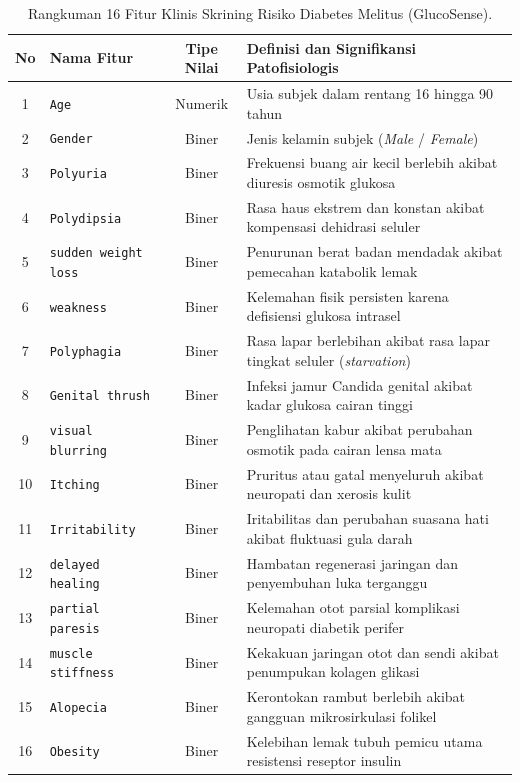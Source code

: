 \documentclass[a4paper,oneside,12pt]{report}
\begin{document}
\begin{table}[H]
\centering
\caption{Rangkuman 16 Fitur Klinis Skrining Risiko Diabetes Melitus (GlucoSense).}
\label{tab:fitur-diabetes}
\small
\begin{tabularx}{\linewidth}{|c|l|c|>{\raggedright\arraybackslash}X|}
\hline
\textbf{No} & \textbf{Nama Fitur} & \textbf{Tipe Nilai} & \textbf{Definisi dan Signifikansi Patofisiologis} \\
\hline
1 & \texttt{Age} & Numerik & Usia subjek dalam rentang 16 hingga 90 tahun \\
\hline
2 & \texttt{Gender} & Biner & Jenis kelamin subjek (\textit{Male} / \textit{Female}) \\
\hline
3 & \texttt{Polyuria} & Biner & Frekuensi buang air kecil berlebih akibat diuresis osmotik glukosa \\
\hline
4 & \texttt{Polydipsia} & Biner & Rasa haus ekstrem dan konstan akibat kompensasi dehidrasi seluler \\
\hline
5 & \texttt{sudden weight loss} & Biner & Penurunan berat badan mendadak akibat pemecahan katabolik lemak \\
\hline
6 & \texttt{weakness} & Biner & Kelemahan fisik persisten karena defisiensi glukosa intrasel \\
\hline
7 & \texttt{Polyphagia} & Biner & Rasa lapar berlebihan akibat rasa lapar tingkat seluler (\textit{starvation}) \\
\hline
8 & \texttt{Genital thrush} & Biner & Infeksi jamur Candida genital akibat kadar glukosa cairan tinggi \\
\hline
9 & \texttt{visual blurring} & Biner & Penglihatan kabur akibat perubahan osmotik pada cairan lensa mata \\
\hline
10 & \texttt{Itching} & Biner & Pruritus atau gatal menyeluruh akibat neuropati dan xerosis kulit \\
\hline
11 & \texttt{Irritability} & Biner & Iritabilitas dan perubahan suasana hati akibat fluktuasi gula darah \\
\hline
12 & \texttt{delayed healing} & Biner & Hambatan regenerasi jaringan dan penyembuhan luka terganggu \\
\hline
13 & \texttt{partial paresis} & Biner & Kelemahan otot parsial komplikasi neuropati diabetik perifer \\
\hline
14 & \texttt{muscle stiffness} & Biner & Kekakuan jaringan otot dan sendi akibat penumpukan kolagen glikasi \\
\hline
15 & \texttt{Alopecia} & Biner & Kerontokan rambut berlebih akibat gangguan mikrosirkulasi folikel \\
\hline
16 & \texttt{Obesity} & Biner & Kelebihan lemak tubuh pemicu utama resistensi reseptor insulin \\
\hline
\end{tabularx}
\end{table}
\end{document}
